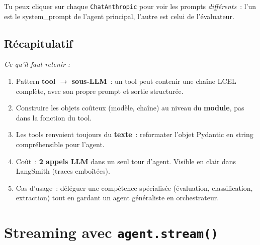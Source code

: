 \documentclass[11pt,a4paper]{article}
\begin{document}
Tu peux cliquer sur chaque \texttt{ChatAnthropic} pour voir les
prompts \emph{différents}~: l'un est le system\_prompt de l'agent
principal, l'autre est celui de l'évaluateur.

\subsection*{Récapitulatif}
{\itshape\sloppy
\textit{Ce qu'il faut retenir :}
\begin{enumerate}[leftmargin=*]
  \item Pattern \textbf{tool $\to$ sous-LLM}~: un tool peut contenir
        une chaîne LCEL complète, avec son propre prompt et sortie
        structurée.
  \item Construire les objets coûteux (modèle, chaîne) au niveau du
        \textbf{module}, pas dans la fonction du tool.
  \item Les tools renvoient toujours du \textbf{texte}~: reformater
        l'objet Pydantic en string compréhensible pour l'agent.
  \item Coût~: \textbf{2 appels LLM} dans un seul tour d'agent. Visible
        en clair dans LangSmith (traces emboîtées).
  \item Cas d'usage~: déléguer une compétence spécialisée
        (évaluation, classification, extraction) tout en gardant un
        agent généraliste en orchestrateur.
\end{enumerate}
\par}

\section{Streaming avec \texttt{agent.stream()}}
\end{document}

